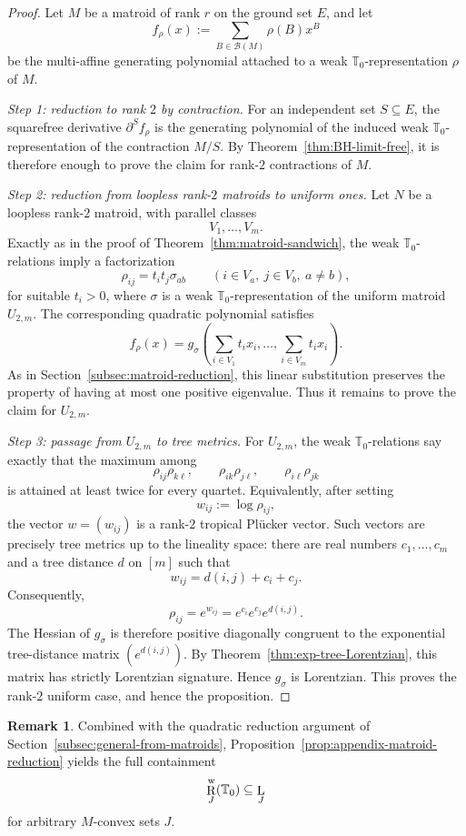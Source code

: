 \documentclass[12pt]{amsart}
\theoremstyle{definition}
\newtheorem{remark}[theorem]{Remark}
\newcommand{\1}{\mathbf{1}}
\DeclareMathOperator{\upL}{L}   %
\DeclareMathOperator{\upR}{R}   %
\newcommand\T{{\mathbb T}}
\begin{document}
\begin{proof}
Let $M$ be a matroid of rank $r$ on the ground set $E$, and let
\[
f_\rho(x):=\sum_{B\in \mathcal B(M)} \rho(B)x^B
\]
be the multi-affine generating polynomial attached to a weak $\T_0$-representation
$\rho$ of $M$.

\emph{Step 1: reduction to rank $2$ by contraction.}
For an independent set $S\subseteq E$, the squarefree derivative $\partial^S f_\rho$
is the generating polynomial of the induced weak $\T_0$-representation of the
contraction $M/S$.  By Theorem~\ref{thm:BH-limit-free}, it is therefore enough to
prove the claim for rank-$2$ contractions of $M$.

\emph{Step 2: reduction from loopless rank-$2$ matroids to uniform ones.}
Let $N$ be a loopless rank-$2$ matroid, with parallel classes
\[
V_1,\dots,V_m.
\]
Exactly as in the proof of Theorem~\ref{thm:matroid-sandwich}, the weak
$\T_0$-relations imply a factorization
\[
\rho_{ij}=t_i t_j \sigma_{ab}
\qquad (i\in V_a,\ j\in V_b,
\ a\neq b),
\]
for suitable $t_i>0$, where $\sigma$ is a weak $\T_0$-representation of the uniform
matroid $U_{2,m}$.  The corresponding quadratic polynomial satisfies
\[
f_\rho(x)=g_\sigma\!\left(\sum_{i\in V_1} t_i x_i,\dots,
\sum_{i\in V_m} t_i x_i\right).
\]
As in Section~\ref{subsec:matroid-reduction}, this linear substitution preserves the
property of having at most one positive eigenvalue.  Thus it remains to prove the
claim for $U_{2,m}$.

\emph{Step 3: passage from $U_{2,m}$ to tree metrics.}
For $U_{2,m}$, the weak $\T_0$-relations say exactly that the maximum among
\[
\rho_{ij}\rho_{k\ell},
\qquad
\rho_{ik}\rho_{j\ell},
\qquad
\rho_{i\ell}\rho_{jk}
\]
is attained at least twice for every quartet.  Equivalently, after setting
\[
w_{ij}:=\log \rho_{ij},
\]
the vector $w=(w_{ij})$ is a rank-$2$ tropical Pl\"ucker vector.  Such vectors are
precisely tree metrics up to the lineality space: there are real numbers
$c_1,\dots,c_m$ and a tree distance $d$ on $[m]$ such that
\[
w_{ij}=d(i,j)+c_i+c_j.
\]
Consequently,
\[
\rho_{ij}=e^{w_{ij}}=e^{c_i}e^{c_j}e^{d(i,j)}.
\]
The Hessian of $g_\sigma$ is therefore positive diagonally congruent to the exponential
tree-distance matrix $(e^{d(i,j)})$.  By
Theorem~\ref{thm:exp-tree-Lorentzian}, this matrix has strictly Lorentzian signature.
Hence $g_\sigma$ is Lorentzian.  This proves the rank-$2$ uniform case, and hence
the proposition.
\end{proof}

\begin{remark}
\label{rem:appendix-reduction}
Combined with the quadratic reduction argument of
Section~\ref{subsec:general-from-matroids}, Proposition~\ref{prop:appendix-matroid-reduction} yields the full containment
\[
\upR_J^{\rm w}(\T_0)\subseteq \upL_J
\]
for arbitrary $M$-convex sets $J$.
\end{remark}
\end{document}
